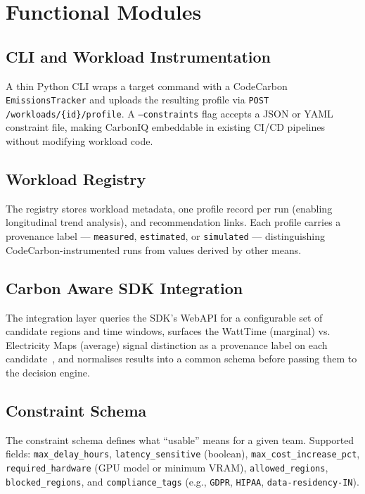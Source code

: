 ﻿\documentclass[conference]{IEEEtran}
\begin{document}
\section{Functional Modules}

\subsection{CLI and Workload Instrumentation}

A thin Python CLI wraps a target command with a CodeCarbon
\texttt{EmissionsTracker} and uploads the resulting profile via
\texttt{POST /workloads/\{id\}/profile}.
A \texttt{--constraints} flag accepts a JSON or YAML constraint file,
making CarbonIQ embeddable in existing CI/CD pipelines without modifying
workload code.

\subsection{Workload Registry}

The registry stores workload metadata, one profile record per run
(enabling longitudinal trend analysis), and recommendation links.
Each profile carries a provenance label --- \texttt{measured},
\texttt{estimated}, or \texttt{simulated} --- distinguishing
CodeCarbon-instrumented runs from values derived by other means.

\subsection{Carbon Aware SDK Integration}

The integration layer queries the SDK's WebAPI for a configurable set of candidate
regions and time windows, surfaces the WattTime (marginal) vs. Electricity Maps
(average) signal distinction as a provenance label on each
candidate~\cite{carbonaware_signal_issue}, and normalises results into a common schema
before passing them to the decision engine.

\subsection{Constraint Schema}

The constraint schema defines what ``usable'' means for a given team.
Supported fields: \texttt{max\_delay\_hours}, \texttt{latency\_sensitive} (boolean),
\texttt{max\_cost\_increase\_pct}, \texttt{required\_hardware} (GPU model or minimum
VRAM), \texttt{allowed\_regions}, \texttt{blocked\_regions}, and
\texttt{compliance\_tags} (e.g., \texttt{GDPR}, \texttt{HIPAA},
\texttt{data-residency-IN}).
\end{document}
